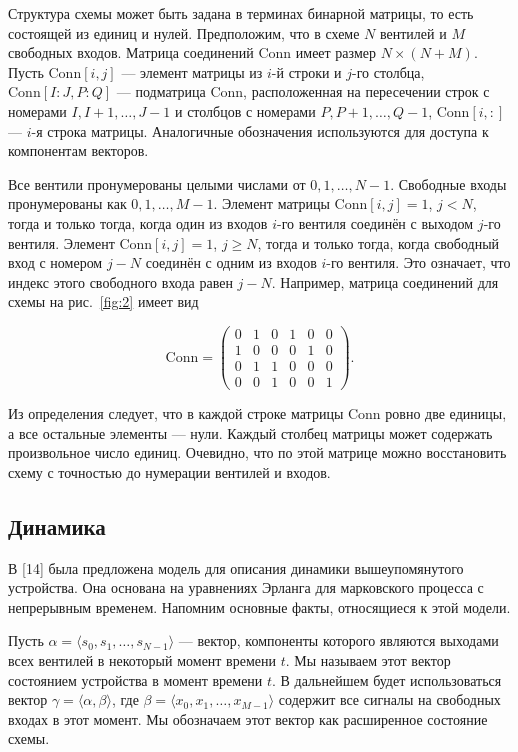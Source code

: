 \documentclass[a4paper,12pt]{article}
\begin{document}
Структура схемы может быть задана в терминах бинарной матрицы, то есть состоящей из единиц и нулей. Предположим, что в схеме \(N\) вентилей и \(M\) свободных входов. Матрица соединений \(\mathrm{Conn}\) имеет размер \(N \times (N + M)\). Пусть \(\mathrm{Conn}[i,j]\) --- элемент матрицы из \(i\)-й строки и \(j\)-го столбца, \(\mathrm{Conn}[I:J,P:Q]\) --- подматрица \(\mathrm{Conn}\), расположенная на пересечении строк с номерами \(I, I+1, \ldots, J-1\) и столбцов с номерами \(P, P+1, \ldots, Q-1\), \(\mathrm{Conn}[i,:]\) --- \(i\)-я строка матрицы. Аналогичные обозначения используются для доступа к компонентам векторов.

Все вентили пронумерованы целыми числами от \(0,1,\dots,N-1\). Свободные входы пронумерованы как \(0,1,\dots,M-1\). Элемент матрицы \(\mathrm{Conn}[i,j] = 1\), \(j < N\), тогда и только тогда, когда один из входов \(i\)-го вентиля соединён с выходом \(j\)-го вентиля. Элемент \(\mathrm{Conn}[i,j] = 1\), \(j \geq N\), тогда и только тогда, когда свободный вход с номером \(j - N\) соединён с одним из входов \(i\)-го вентиля. Это означает, что индекс этого свободного входа равен \(j - N\). Например, матрица соединений для схемы на рис.~\ref{fig:2} имеет вид

\[
\mathrm{Conn} =
\begin{pmatrix}
0 & 1 & 0 & 1 & 0 & 0 \\
1 & 0 & 0 & 0 & 1 & 0 \\
0 & 1 & 1 & 0 & 0 & 0 \\
0 & 0 & 1 & 0 & 0 & 1
\end{pmatrix}.
\]

Из определения следует, что в каждой строке матрицы \(\mathrm{Conn}\) ровно две единицы, а все остальные элементы --- нули. Каждый столбец матрицы может содержать произвольное число единиц. Очевидно, что по этой матрице можно восстановить схему с точностью до нумерации вентилей и входов.

\subsection{Динамика}

В [14] была предложена модель для описания динамики вышеупомянутого устройства. Она основана на уравнениях Эрланга для марковского процесса с непрерывным временем. Напомним основные факты, относящиеся к этой модели.

Пусть \(\alpha = \langle s_0, s_1, \ldots, s_{N-1} \rangle\) --- вектор, компоненты которого являются выходами всех вентилей в некоторый момент времени \(t\). Мы называем этот вектор состоянием устройства в момент времени \(t\). В дальнейшем будет использоваться вектор \(\gamma = \langle \alpha, \beta \rangle\), где \(\beta = \langle x_0, x_1, \ldots, x_{M-1} \rangle\) содержит все сигналы на свободных входах в этот момент. Мы обозначаем этот вектор как расширенное состояние схемы.
\end{document}

